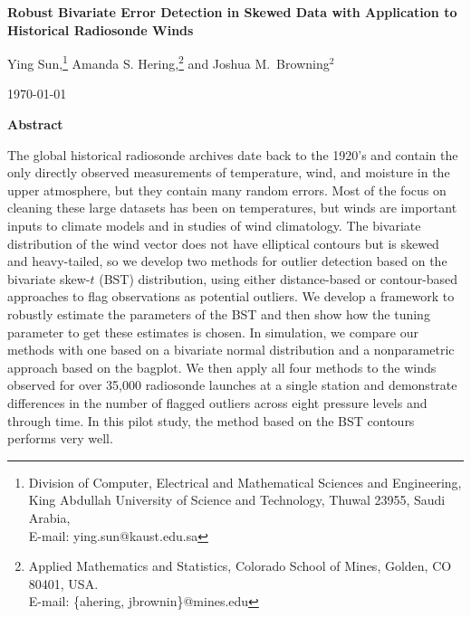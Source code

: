 \documentclass[12pt]{article}
\begin{document}
\thispagestyle{empty}
\baselineskip=28pt
\vskip 5mm
\begin{center} {\Large{\bf   Robust Bivariate Error Detection in Skewed  Data with Application to Historical Radiosonde Winds}}
\end{center}



\baselineskip=12pt
\vskip 5mm

\begin{center}\large
Ying Sun,\footnote{ \baselineskip=10pt
Division of Computer, Electrical and Mathematical Sciences and Engineering, King Abdullah University of Science and Technology, Thuwal 23955, Saudi Arabia, \\E-mail: ying.sun@kaust.edu.sa}  Amanda S. Hering,\footnote{ \baselineskip=10pt
Applied Mathematics and Statistics, Colorado School of Mines, Golden, CO 80401,
USA. \\E-mail: \{ahering, jbrownin\}@mines.edu} and Joshua M.~Browning$^2$ 




\end{center}

\baselineskip=17pt
\vskip 5mm
\centerline{\today}
\vskip 5mm

\begin{center}
{\large{\bf Abstract}}
\end{center}
\baselineskip=14pt

The global historical radiosonde archives date back to the 1920's and contain the  only directly observed measurements of temperature, wind, and moisture in the upper atmosphere, but they contain many random errors.   Most of the focus on cleaning these large datasets has been on temperatures, but  winds are important inputs to climate models and in studies of wind climatology.  The bivariate distribution of the  wind vector does not have elliptical contours but is skewed and heavy-tailed, so we develop two methods for outlier detection based on the bivariate skew-$t$ (BST) distribution, using  either distance-based or contour-based approaches to flag observations as potential outliers.  We develop a framework to robustly estimate the parameters of the BST and then show how the tuning parameter to get these estimates is chosen.  In simulation, we compare our methods with one based on a bivariate normal distribution and a nonparametric approach based on the bagplot.  We then apply all four methods to the winds observed for over 35,000 radiosonde launches at a single station and demonstrate differences in the number of flagged outliers  across eight pressure levels and through time.  In this pilot study,  the method based on the BST contours  performs very well.
\end{document}

